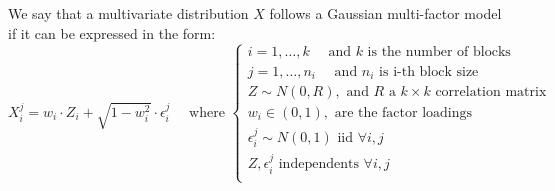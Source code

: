 \documentclass[11pt,fleqn]{book} %
\begin{document}
\begin{definition}
We say that a multivariate distribution $X$ follows a Gaussian multi-factor
model if it can be expressed in the form:
\begin{displaymath}
X_i^j = w_i \cdot Z_i + \sqrt{1-w_i^2} \cdot \epsilon_i^j
\quad \text{ where } \left\{
\begin{array}{l}
i = 1, \dots, k \quad \text{ and $k$ is the number of blocks} \\
j = 1, \dots, n_i \quad \text{ and $n_i$ is i-th block size} \\
Z \sim N(0,R), \text{ and $R$ a $k \times k$ correlation matrix} \\
w_i \in (0,1), \text{ are the factor loadings } \\
\epsilon_i^j \sim N(0,1) \text { iid } \forall i,j \\
Z, \epsilon_i^j \text{ independents } \forall i,j \\
\end{array}
\right.
\end{displaymath}
\end{definition}
\end{document}
